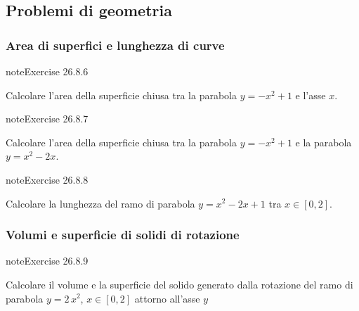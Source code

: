 \documentclass[letterpaper,10pt,italian]{jupyterBook}
\begin{document}
\subsection{Problemi di geometria}
\label{\detokenize{ch/infinitesimal_calculus/integrals-problems:problemi-di-geometria}}

\subsubsection{Area di superfici e lunghezza di curve}
\label{\detokenize{ch/infinitesimal_calculus/integrals-problems:area-di-superfici-e-lunghezza-di-curve}} \label{exercise:ch/infinitesimal_calculus/integrals-problems-exercise-5}

\begin{sphinxadmonition}{note}{Exercise 26.8.6}



\sphinxAtStartPar
Calcolare l’area della superficie chiusa tra la parabola \(y = - x^2 + 1\) e l’asse \(x\).
\end{sphinxadmonition}
 \label{exercise:ch/infinitesimal_calculus/integrals-problems-exercise-6}

\begin{sphinxadmonition}{note}{Exercise 26.8.7}



\sphinxAtStartPar
Calcolare l’area della superficie chiusa tra la parabola \(y = - x^2 + 1\) e la parabola \(y = x^2 - 2 x\).
\end{sphinxadmonition}
 \label{exercise:ch/infinitesimal_calculus/integrals-problems-exercise-7}

\begin{sphinxadmonition}{note}{Exercise 26.8.8}



\sphinxAtStartPar
Calcolare la lunghezza del ramo di parabola \(y = x^2 - 2x + 1\) tra \(x \in [0,2]\).
\end{sphinxadmonition}


\subsubsection{Volumi e superficie di solidi di rotazione}
\label{\detokenize{ch/infinitesimal_calculus/integrals-problems:volumi-e-superficie-di-solidi-di-rotazione}} \label{exercise:ch/infinitesimal_calculus/integrals-problems-exercise-8}

\begin{sphinxadmonition}{note}{Exercise 26.8.9}





\sphinxAtStartPar
Calcolare il volume e la superficie del solido generato dalla rotazione del ramo di parabola \(y = 2\, x^2\), \(x \in [0,2]\) attorno all’asse \(y\)
\end{sphinxadmonition}
 \label{exercise:ch/infinitesimal_calculus/integrals-problems-exercise-9}
\end{document}
